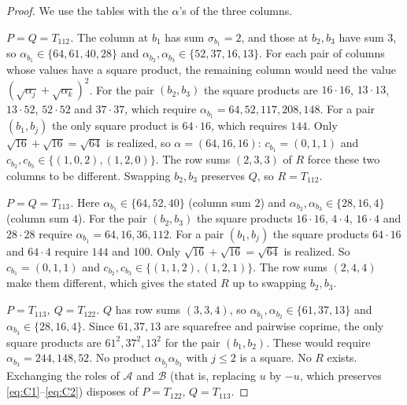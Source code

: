 \documentclass[11pt,a4paper]{amsart}
\theoremstyle{definition}
\theoremstyle{remark}
\newcommand{\cA}{\mathcal{A}}
\newcommand{\cB}{\mathcal{B}}
\begin{document}
\begin{proof}
We use the tables with the $\alpha$'s of the three columns.

\emph{$P=Q=T_{112}$.} The column at $b_1$ has sum $\sigma_{b_1}=2$, and those at $b_2,b_3$ have sum $3$,
so $\alpha_{b_1}\in\{64,61,40,28\}$ and $\alpha_{b_2},\alpha_{b_3}\in\{52,37,16,13\}$. For each pair of
columns whose values have a square product, the remaining column would need the value
$(\sqrt{\alpha_j}+\sqrt{\alpha_k})^2$. For the pair $(b_2,b_3)$ the square products are $16\cdot16$,
$13\cdot13$, $13\cdot52$, $52\cdot52$ and $37\cdot37$, which require $\alpha_{b_1}=64,52,117,208,148$. For a
pair $(b_1,b_j)$ the only square product is $64\cdot16$, which requires $144$. Only
$\sqrt{16}+\sqrt{16}=\sqrt{64}$ is realized, so $\alpha=(64,16,16)$: $c_{b_1}=(0,1,1)$ and
$c_{b_2},c_{b_3}\in\{(1,0,2),(1,2,0)\}$. The row sums $(2,3,3)$ of $R$ force these two columns to be
different. Swapping $b_2,b_3$ preserves $Q$, so $R=T_{112}$.

\emph{$P=Q=T_{113}$.} Here $\alpha_{b_1}\in\{64,52,40\}$ (column sum $2$) and
$\alpha_{b_2},\alpha_{b_3}\in\{28,16,4\}$ (column sum $4$). For the pair $(b_2,b_3)$ the square products
$16\cdot16$, $4\cdot4$, $16\cdot4$ and $28\cdot28$ require $\alpha_{b_1}=64,16,36,112$. For a pair
$(b_1,b_j)$ the square products $64\cdot16$ and $64\cdot4$ require $144$ and $100$. Only
$\sqrt{16}+\sqrt{16}=\sqrt{64}$ is realized. So $c_{b_1}=(0,1,1)$ and $c_{b_2},c_{b_3}\in\{(1,1,2),(1,2,1)\}$. The row sums
$(2,4,4)$ make them different, which gives the stated $R$ up to swapping $b_2,b_3$.

\emph{$P=T_{113}$, $Q=T_{122}$.} $Q$ has row sums $(3,3,4)$, so $\alpha_{b_1},\alpha_{b_2}\in\{61,37,13\}$
and $\alpha_{b_3}\in\{28,16,4\}$. Since $61,37,13$ are squarefree and pairwise coprime, the only square
products are $61^2,37^2,13^2$ for the pair $(b_1,b_2)$. These would require $\alpha_{b_3}=244,148,52$. No
product $\alpha_{b_j}\alpha_{b_3}$ with $j\le2$ is a square. No $R$ exists. Exchanging the roles of $\cA$
and $\cB$ (that is, replacing $u$ by $-u$, which preserves \eqref{eq:C1}--\eqref{eq:C2}) disposes of
$P=T_{122}$, $Q=T_{113}$.


\end{proof}
\end{document}

